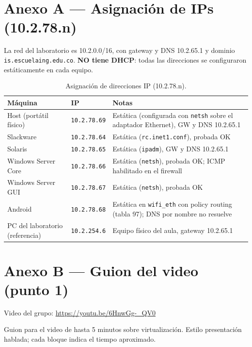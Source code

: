 \documentclass[11pt,a4paper]{report}
\begin{document}
\section*{Anexo A --- Asignación de IPs (10.2.78.n)}

La red del laboratorio es 10.2.0.0/16, con gateway y DNS 10.2.65.1 y dominio \texttt{is.escuelaing.edu.co}. \textbf{NO tiene DHCP}: todas las direcciones se configuraron estáticamente en cada equipo.

\begin{table}[H]
  \centering
  \begin{tabularx}{\linewidth}{@{}lXp{5.5cm}@{}}
    \toprule
    \textbf{Máquina} & \textbf{IP} & \textbf{Notas} \\
    \midrule
    Host (portátil físico) & \texttt{10.2.78.69} & Estática (configurada con \texttt{netsh} sobre el adaptador Ethernet), GW y DNS 10.2.65.1 \\
    Slackware & \texttt{10.2.78.64} & Estática (\texttt{rc.inet1.conf}), probada OK \\
    Solaris & \texttt{10.2.78.65} & Estática (\texttt{ipadm}), GW y DNS 10.2.65.1 \\
    Windows Server Core & \texttt{10.2.78.66} & Estática (\texttt{netsh}), probada OK; ICMP habilitado en el firewall \\
    Windows Server GUI & \texttt{10.2.78.67} & Estática (\texttt{netsh}), probada OK \\
    Android & \texttt{10.2.78.68} & Estática en \texttt{wifi\_eth} con policy routing (tabla 97); DNS por nombre no resuelve \\
    PC del laboratorio (referencia) & \texttt{10.2.254.6} & Equipo físico del aula, gateway 10.2.65.1 \\
    \bottomrule
  \end{tabularx}
  \caption{Asignación de direcciones IP (10.2.78.n).}
  \label{tab:ips}
\end{table}

\section*{Anexo B --- Guion del video (punto 1)}

Video del grupo: \url{https://youtu.be/6HnwGg-_QV0}

Guion para el video de hasta 5 minutos sobre virtualización. Estilo presentación hablada; cada bloque indica el tiempo aproximado.
\end{document}
